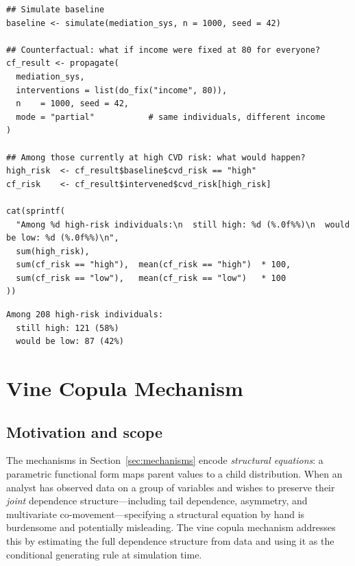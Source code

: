 \documentclass[article]{jss}
\begin{document}
\begin{tcolorbox}[codebox, title={\small\textbf{R} code --- counterfactual query}]
\begin{verbatim}
## Simulate baseline
baseline <- simulate(mediation_sys, n = 1000, seed = 42)

## Counterfactual: what if income were fixed at 80 for everyone?
cf_result <- propagate(
  mediation_sys,
  interventions = list(do_fix("income", 80)),
  n    = 1000, seed = 42,
  mode = "partial"           # same individuals, different income
)

## Among those currently at high CVD risk: what would happen?
high_risk  <- cf_result$baseline$cvd_risk == "high"
cf_risk    <- cf_result$intervened$cvd_risk[high_risk]

cat(sprintf(
  "Among %d high-risk individuals:\n  still high: %d (%.0f%%)\n  would be low: %d (%.0f%%)\n",
  sum(high_risk),
  sum(cf_risk == "high"),  mean(cf_risk == "high")  * 100,
  sum(cf_risk == "low"),   mean(cf_risk == "low")   * 100
))
\end{verbatim}
\end{tcolorbox}

\begin{tcolorbox}[outputbox, title={\small Output}]
\begin{verbatim}
Among 208 high-risk individuals:
  still high: 121 (58%)
  would be low: 87 (42%)
\end{verbatim}
\end{tcolorbox}

\section{Vine Copula Mechanism}
\label{sec:copula}

\subsection{Motivation and scope}
\label{sec:copula_motivation}

The mechanisms in Section~\ref{sec:mechanisms} encode \emph{structural equations}:
a parametric functional form maps parent values to a child distribution. When an
analyst has observed data on a group of variables and wishes to preserve their
\emph{joint} dependence structure---including tail dependence, asymmetry, and
multivariate co-movement---specifying a structural equation by hand is burdensome
and potentially misleading. The vine copula mechanism addresses this by estimating
the full dependence structure from data and using it as the conditional generating
rule at simulation time.
\end{document}
